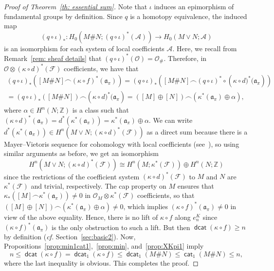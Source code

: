 \documentclass[amscd,amssymb,verbatim,11pt]{amsart}
\theoremstyle{plain}
\theoremstyle{definition}
\DeclareMathOperator{\cat}{{\mathsf{cat}}}
\DeclareMathOperator{\dcat}{{\mathsf{dcat}}}
\newcommand{\F}{\mathcal{F}}
\def\scr{\mathcal}
\def\A{{\scr A}}
\def\O{{\scr O}}
\def\Z{{\mathbb Z}}
\begin{document}
\begin{proof}[Proof of Theorem~\ref{th: essential sum}]
Note that $\iota$ induces an epimorphism of fundamental groups by definition. Since $q$ is a homotopy equivalence, the induced map 
\[
    (q\circ \iota)_*:H_0(M\# N;(q\circ \iota)^*(\A)) \to H_0(M\vee N;\A)
    \]
is an isomorphism for each system of local coefficients $\A$. Here, we recall from Remark~\ref{rem: sheaf details} that $(q\circ\iota)^*(\O)=\O_{\#}$. Therefore, in $\O\otimes (\kappa\circ d)^*(\F)$ coefficients, we have that
\begin{multline*}
(q \circ \iota)_*\left([M\#N]\frown (\kappa\circ f)^*(\mathfrak{a}_\pi)\right)
= (q \circ \iota)_*\left([M\#N]\frown (q \circ \iota)^* \circ \left(\kappa\circ d)^*(\mathfrak{a}_\pi\right)\right)
\\
= (q \circ \iota)_*([M\# N])\frown \left(\kappa\circ d)^*(\mathfrak{a}_\pi\right)
= ([M]\oplus [N])\frown(\kappa^*(\mathfrak{a}_\pi)\oplus \alpha),
\end{multline*}
where $\alpha\in H^n(N;\Z)$ is a class such that $(\kappa\circ d)^*(\mathfrak{a}_\pi)=d^*(\kappa^*(\mathfrak{a}_\pi))=\kappa^*(\mathfrak{a}_\pi)\oplus \alpha$. We can write $d^*(\kappa^*(\mathfrak{a}_\pi))\in H^n(M\vee N;(\kappa\circ d)^*(\F))$ as a direct sum because there is a Mayer--Vietoris sequence for cohomology with local coefficients (see~\cite[Chapter~II,~Section~13]{Bre}), so using similar arguments as before, we get an isomorphism 
\[
H^n(M\vee N;(\kappa\circ d)^*(\F))\cong H^n(M;\kappa^*(\F))\oplus H^n(N;\Z)
\]
since the restrictions of the coefficient system $(\kappa\circ d)^*(\F)$ to $M$ and $N$ are $\kappa^*(\F)$ and trivial, respectively.
The cap property on $M$ ensures that $\kappa_*([M]\frown \kappa^*(\mathfrak{a}_\pi))\ne 0$ in $\O_M\otimes \kappa^*(\F)$ coefficients, so that $([M]\oplus [N])\frown(\kappa^*(\mathfrak{a}_\pi)\oplus \alpha) \ne 0$, which implies $(\kappa\circ f)^*(\mathfrak{a}_\pi)\ne 0$ in view of the above equality. Hence, there is no lift of $\kappa\circ f$ along $e^K_n$ since $(\kappa\circ f)^*(\mathfrak{a}_\pi)$ is the only obstruction to such a lift. But then $\dcat(\kappa\circ f)\ge n$ by definition (\emph{cf.} Section~\ref{sec:basic2}). Now, Propositions~\ref{prop:min1cat1},~\ref{prop:min}, and~\ref{prop:XKpi1} imply
\[
n\le\dcat(\kappa\circ f)=\dcat_1(\kappa\circ f)\le\dcat_1(M\# N)\le\cat_1(M\# N)\le n,
\]
where the last inequality is obvious. This completes the proof.
\end{proof}
\end{document}
